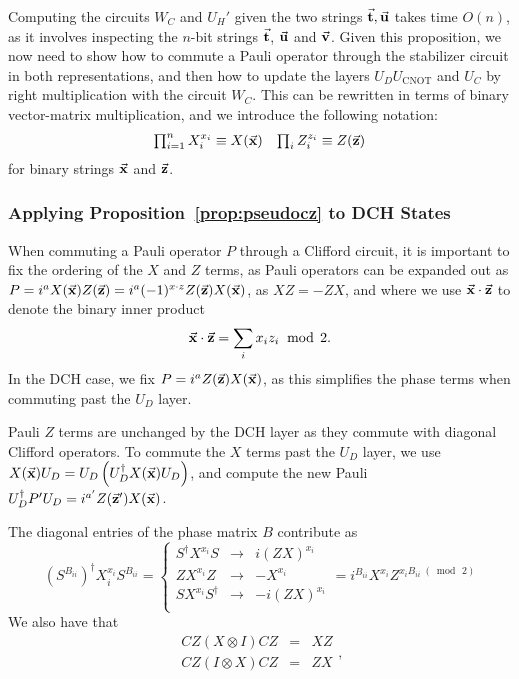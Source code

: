 Computing the circuits $W_{C}$ and $U_{H}'$ given the two strings $\va{t},\va{u}$ takes time $O(n)$, as it involves inspecting the $n$-bit strings $\va{t}$, $\va{u}$ and $\va{v}$. Given this proposition, we now need to show how to commute a Pauli operator through the stabilizer circuit in both representations, and then how to update the layers $U_{D}U_{\text{CNOT}}$ and $U_{C}$ by right multiplication with the circuit $W_{C}$. This can be rewritten in terms of binary vector-matrix multiplication, and we introduce the following notation:
\[
\begin{array}{lr}
\prod_{i=1}^{n}X_{i}^{x_{i}} \equiv X(\va{x}) & \prod_{i}Z_{i}^{z_{i}} \equiv Z(\va{z})
\end{array}
\]
for binary strings $\va{x}$ and $\va{z}$.
\subsubsection*{Applying Proposition~\ref{prop:pseudocz} to DCH States}
When commuting a Pauli operator $P$ through a Clifford circuit, it is important to fix the ordering of the $X$ and $Z$ terms, as Pauli operators can be expanded out as $P=i^{a}X(\va{x})Z(\va{z}) = i^{a}(-1)^{x\cdot z}Z(\va{z})X(\va{x})$, as $XZ=-ZX$, and where we use $\va{x}\cdot \va{z}$ to denote the binary inner product
\[\va{x}\cdot \va{z} = \sum_{i}x_{i}z_{i}\;\bmod\,2.\]
In the DCH case, we fix $P=i^{a}Z(\va{z})X(\va{x})$, as this simplifies the phase terms when commuting past the $U_{D}$ layer.\par
Pauli $Z$ terms are unchanged by the DCH layer as they commute with diagonal Clifford operators. To commute the $X$ terms past the $U_{D}$ layer, we use $X(\va{x})U_{D} = U_{D}\left(U_{D}^{\dagger}X(\va{x})U_{D}\right)$, and compute the new Pauli $U_{D}^{\dagger}P'U_{D}=i^{a'}Z(\va{z}')X(\va{x})$.\par
The diagonal entries of the phase matrix $B$ contribute as
\[(S^{B_{ii}})^{\dagger} X_{i}^{x_{i}} S^{B_{ii}} = \left\{
\begin{array}{rcl}
S^{\dagger}X^{x_{i}} S & \rightarrow & i(ZX)^{x_{i}} \\
ZX^{x_{i}}Z & \rightarrow & -X^{x_{i}}\\
SX^{x_{i}}S^{\dagger} & \rightarrow & -i (ZX)^{x_{i}}\\
\end{array} = i^{B_{ii}}X^{x_{i}}Z^{x_{i}B_{ii}\;(\bmod\,2)}
\right.\]
We also have that 
\[
\begin{array}{lcr}
CZ (X\otimes I) CZ &=& XZ\\
CZ(I\otimes X)CZ &=& ZX
\end{array},\]
